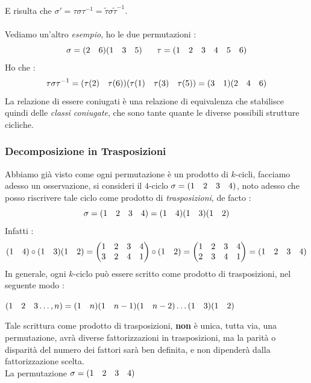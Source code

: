 \documentclass[12pt, letterpaper]{article}
\newcommand{\spaz}{{\text{\hphantom{aa}}}}
\newcommand{\acc}{\\\hphantom{}\\}
\begin{document}
E risulta che  \(\sigma' = \tau\sigma\tau^{-1}=\tilde\tau\sigma\tilde\tau^{-1}\).\acc 
Vediamo un'altro \textit{esempio}, ho le due permutazioni : \begin{equation}
    \sigma = (2\spaz6)(1\spaz3\spaz5)\text{\hphantom{text}}\tau = (1\spaz2\spaz3\spaz4\spaz5\spaz6)
\end{equation}
Ho che :\begin{equation}
    \tau\sigma \tau^{-1} =(\tau(2)\spaz\tau(6))(\tau(1)\spaz\tau(3)\spaz\tau(5))=(3\spaz 1)(2\spaz4\spaz6)
\end{equation}
La relazione di essere coniugati è una relazione di equivalenza che stabilisce quindi delle \textit{classi coniugate}, 
che sono tante quante le diverse possibili strutture cicliche.
\subsubsection{Decomposizione in Trasposizioni}
Abbiamo già visto come ogni permutazione è un prodotto di \(k\)-cicli, facciamo adesso un osservazione, si consideri 
il \(4\)-ciclo \(\sigma=(1\spaz2\spaz3\spaz4)\), noto adesso che posso riscrivere tale ciclo come 
prodotto di \textit{trasposizioni}, de facto : \begin{equation}
    \sigma=(1\spaz2\spaz3\spaz4)=(1\spaz4)(1\spaz3)(1\spaz2)
\end{equation}
Infatti : \begin{equation}
    (1\spaz4)\circ(1\spaz3)(1\spaz2)=\begin{pmatrix}
        1 & 2 & 3&4\\
        3 & 2 & 4&1
        \end{pmatrix}\circ(1\spaz2)=\begin{pmatrix}
            1 & 2 & 3&4\\
            2 & 3 & 4&1
            \end{pmatrix}=(1\spaz2\spaz3\spaz4)
\end{equation}
In generale, ogni \(k\)-ciclo può essere scritto come prodotto di trasposizioni, nel seguente modo :
\begin{center}
    \(
    (1\spaz2\spaz3\dots, n)= (1\spaz n)(1\spaz n-1)  (1\spaz n-2)\dots (1\spaz3)(1\spaz 2) 
    \)
\end{center}
Tale scrittura come prodotto di trasposizioni, \textbf{non} è unica, tutta via, una permutazione, avrà diverse 
fattorizzazioni in trasposizioni, ma la parità o disparità del numero dei fattori sarà ben definita, e non dipenderà 
dalla fattorizzazione scelta. \\ La permutazione \(\sigma=(1\spaz2\spaz3\spaz4)\)
\end{document}
